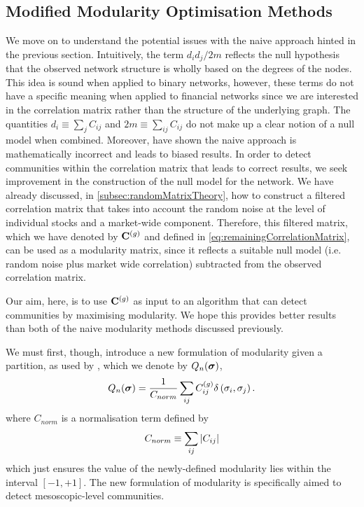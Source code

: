 
\subsection{Modified Modularity Optimisation Methods}
\label{subsec:modifiedModularityOptimisationMethods}

We move on to understand the potential issues with the naive approach hinted in the previous section. Intuitively, the term $d_{i}d_{j}/2m$ reflects the null hypothesis that the observed network structure is wholly based on the degrees of the nodes.
This idea is sound when applied to binary networks, however, these terms do not have a specific meaning when applied to financial networks since we are interested in the correlation matrix rather than the structure of the underlying graph.
The quantities $d_{i} \equiv \sum_{j} C_{ij}$ and $2m \equiv \sum_{ij} C_{ij}$ do not make up a clear notion of a null model when combined.
Moreover, \cite{MG13} have shown the naive approach is mathematically incorrect and leads to biased results.
In order to detect communities within the correlation matrix that leads to correct results, we seek improvement in the construction of the null model for the network.
We have already discussed, in \cref{subsec:randomMatrixTheory}, how to construct a filtered correlation matrix that takes into account the random noise at the level of individual stocks and a market-wide component.
Therefore, this filtered matrix, which we have denoted by $\mathbf C^{(g)}$ and defined in \cref{eq:remainingCorrelationMatrix}, can be used as a modularity matrix, since it reflects a suitable null model (i.e. random noise plus market wide correlation) subtracted from the observed correlation matrix.

Our aim, here, is to use $\mathbf C^{(g)}$ as input to an algorithm that can detect communities by maximising modularity.
We hope this provides better results than both of the naive modularity methods discussed previously.

We must first, though, introduce a new formulation of modularity given a partition, as used by \cite{MG13}, which we denote by $Q_{n}(\vecvar{\sigma})$,
\begin{equation}
\label{eq:newModularityFinancialNetworks}
	Q_{n}(\vecvar{\sigma}) = \frac{1}{C_{norm}} \sum_{ij} C^{(g)}_{ij} \delta \left( \sigma_{i},\sigma_{j} \right).
\end{equation}
where $C_{norm}$ is a normalisation term defined by 
\begin{equation}
\label{eq:newModularityNormalisationConstantFinancialNetworks}
	C_{norm} \equiv \sum_{ij} \left\vert C_{ij}\right\vert
\end{equation}
which just ensures the value of the newly-defined modularity lies within the interval $[-1,+1]$.
The new formulation of modularity is specifically aimed to detect mesoscopic-level communities.

